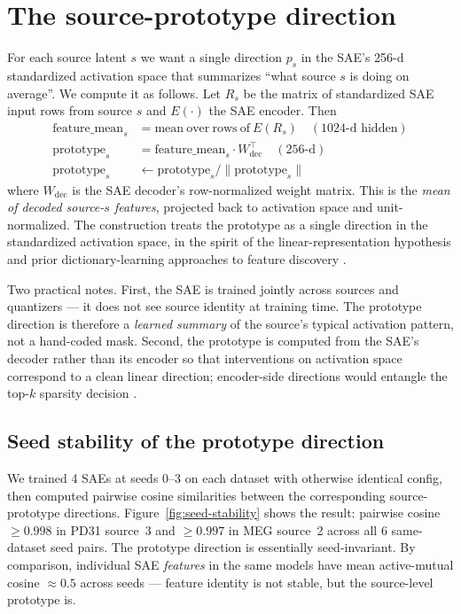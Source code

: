 \documentclass[11pt]{article}
\begin{document}
\section{The source-prototype direction}\label{sec:prototype}

For each source latent $s$ we want a single direction $p_s$ in the SAE's 256-d
standardized activation space that summarizes ``what source $s$ is doing on
average''. We compute it as follows. Let $R_s$ be the matrix of standardized
SAE input rows from source $s$ and $E(\cdot)$ the SAE encoder. Then
\begin{align*}
\mathrm{feature\_mean}_s &= \mathrm{mean\ over\ rows\ of\ } E(R_s) \quad (\text{1024-d hidden})\\
\mathrm{prototype}_s     &= \mathrm{feature\_mean}_s \cdot W_{\mathrm{dec}}^\top \quad (\text{256-d})\\
\mathrm{prototype}_s     &\leftarrow \mathrm{prototype}_s / \|\mathrm{prototype}_s\|
\end{align*}
where $W_{\mathrm{dec}}$ is the SAE decoder's row-normalized weight matrix.
This is the \emph{mean of decoded source-$s$ features}, projected back to
activation space and unit-normalized. The construction treats the
prototype as a single direction in the standardized activation space,
in the spirit of the linear-representation hypothesis
\cite{park2024linear} and prior dictionary-learning approaches to feature
discovery \cite{olshausen1996,bell1995infomax}.

Two practical notes. First, the SAE is trained jointly across sources and
quantizers --- it does not see source identity at training time. The prototype
direction is therefore a \emph{learned summary} of the source's typical
activation pattern, not a hand-coded mask. Second, the prototype is computed
from the SAE's decoder rather than its encoder so that interventions on
activation space correspond to a clean linear direction; encoder-side
directions would entangle the top-$k$ sparsity decision \cite{gao2024scaling}.

\subsection{Seed stability of the prototype direction}

We trained 4 SAEs at seeds 0--3 on each dataset with otherwise identical config,
then computed pairwise cosine similarities between the corresponding
source-prototype directions. Figure~\ref{fig:seed-stability} shows the result:
pairwise cosine $\geq 0.998$ in PD31 source~3 and $\geq 0.997$ in MEG source~2
across all 6 same-dataset seed pairs. The prototype direction is essentially
seed-invariant. By comparison, individual SAE \emph{features} in the same
models have mean active-mutual cosine $\approx 0.5$ across seeds --- feature
identity is not stable, but the source-level prototype is.
\end{document}
